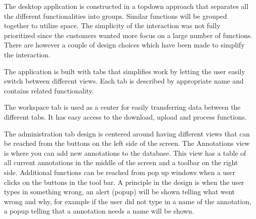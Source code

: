 The desktop application is constructed in a topdown approach that separates all the different functionalities into groups. Similar functions will be grouped together to utilize space. The simplicity of the interaction was not fully prioritized since the customers wanted more focus on a large number of functions. There are however a couple of design choices which have been made to simplify the interaction.

The application is built with tabs that simplifies work by letting the user easily switch between different views. Each tab is described by appropriate name and contains related functionality.

The workspace tab is used as a center for easily transferring data between the different tabs. It has easy access to the download, upload and process functions.

The administration tab design is centered around having different views that can be reached from the buttons on the left side of the screen. The Annotations view is where you can add new annotations to the database. This view has a table of all current annotations in the middle of the screen and a toolbar on the right side. Additional functions can be reached from pop up windows when a user clicks on the buttons in the tool bar.
A principle in the design is when the user types in something wrong, an alert (popup) will be shown telling what went wrong and why, for example if the user did not type in a name of the annotation, a popup telling that a annotation needs a name will be shown.  
\FloatBarrier

